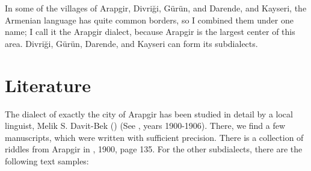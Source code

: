In some of the villages of Arapgir, Divriği, Gürün, and Darende, and Kayseri, the Armenian language has quite common borders, so I combined them under one name; I call it the Arapgir dialect, because Arapgir is the largest center of this area. Divriği, Gürün, Darende, and Kayseri can form its subdialects.


\section{Literature}

The dialect of exactly the city of Arapgir has been studied in detail by a local linguist, Melik S. Davit-Bek () (See , years 1900-1906). There, we find a few manuscripts, which were written with sufficient precision. There is a collection of riddles from Arapgir in , 1900, page 135. For the other subdialects, there are the following text samples:



{\litoverview}

